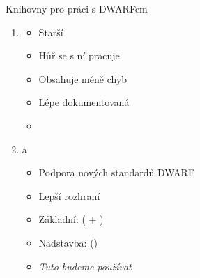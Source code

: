 \begin{frame}{Knihovny pro práci s DWARFem}

  \begin{enumerate}
    \item {}
    \begin{itemize}
      \item Starší
      \item Hůř se s ní pracuje
      \item Obsahuje méně chyb
      \item Lépe dokumentovaná
      \item {}
    \end{itemize}

    \pause

    \item {} a 
    \begin{itemize}
      \item Podpora nových standardů DWARF
      \item Lepší rozhraní
      \item Základní:  ( +
        )
      \item Nadstavba:  ()
      \item \emph{Tuto budeme používat}
    \end{itemize}
  \end{enumerate}

\end{frame}

